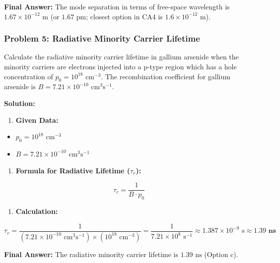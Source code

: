 \textbf{Final Answer:} The mode separation in terms of free-space wavelength is \textbf{$1.67 \times 10^{-12}\text{ m}$} (or \textbf{$1.67\text{ pm}$}; closest option in CA4 is \textbf{$1.6 \times 10^{-12}\text{ m}$}).


\subsubsection{Problem 5: Radiative Minority Carrier Lifetime}
Calculate the radiative minority carrier lifetime in gallium arsenide when the minority carriers are electrons injected into a p-type region which has a hole concentration of $p_0 = 10^{18}\text{ cm}^{-3}$. The recombination coefficient for gallium arsenide is $B = 7.21 \times 10^{-10}\text{ cm}^3\text{s}^{-1}$.

\textbf{Solution:}
\begin{enumerate}
  \item \textbf{Given Data:}
\end{enumerate}
\begin{itemize}
  \item   $p_0 = 10^{18}\text{ cm}^{-3}$
  \item   $B = 7.21 \times 10^{-10}\text{ cm}^3\text{s}^{-1}$
\end{itemize}
\begin{enumerate}
  \item \textbf{Formula for Radiative Lifetime ($\tau_r$):}
\end{enumerate}
    \[ \tau_r = \frac{1}{B \cdot p_0} \]
\begin{enumerate}
  \item \textbf{Calculation:}
\end{enumerate}
    \[ \tau_r = \frac{1}{(7.21 \times 10^{-10}\text{ cm}^3\text{s}^{-1}) \times (10^{18}\text{ cm}^{-3})} = \frac{1}{7.21 \times 10^8\text{ s}^{-1}} \approx 1.387 \times 10^{-9}\text{ s} \approx \mathbf{1.39\text{ ns}} \]

\textbf{Final Answer:} The radiative minority carrier lifetime is \textbf{$1.39\text{ ns}$} (Option c).

